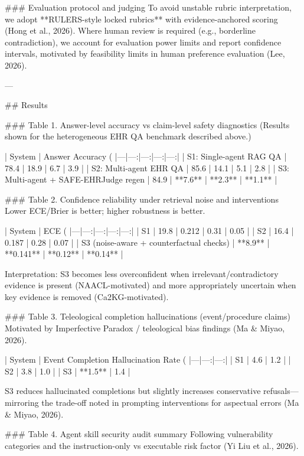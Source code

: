 ### Evaluation protocol and judging  
To avoid unstable rubric interpretation, we adopt **RULERS-style locked rubrics** with evidence-anchored scoring (Hong et al., 2026). Where human review is required (e.g., borderline contradiction), we account for evaluation power limits and report confidence intervals, motivated by feasibility limits in human preference evaluation (Lee, 2026).

---

## Results  

### Table 1. Answer-level accuracy vs claim-level safety diagnostics  
(Results shown for the heterogeneous EHR QA benchmark described above.)

| System | Answer Accuracy (%
|---|---:|---:|---:|---:|
| S1: Single-agent RAG QA | 78.4 | 18.9 | 6.7 | 3.9 |
| S2: Multi-agent EHR QA | 85.6 | 14.1 | 5.1 | 2.8 |
| S3: Multi-agent + SAFE-EHRJudge regen | 84.9 | **7.6** | **2.3** | **1.1** |

### Table 2. Confidence reliability under retrieval noise and interventions  
Lower ECE/Brier is better; higher robustness is better.

| System | ECE (%
|---|---:|---:|---:|---:|
| S1 | 19.8 | 0.212 | 0.31 | 0.05 |
| S2 | 16.4 | 0.187 | 0.28 | 0.07 |
| S3 (noise-aware + counterfactual checks) | **8.9** | **0.141** | **0.12** | **0.14** |

Interpretation: S3 becomes less overconfident when irrelevant/contradictory evidence is present (NAACL-motivated) and more appropriately uncertain when key evidence is removed (Ca2KG-motivated).

### Table 3. Teleological completion hallucinations (event/procedure claims)  
Motivated by Imperfective Paradox / teleological bias findings (Ma & Miyao, 2026).

| System | Event Completion Hallucination Rate (%
|---|---:|---:|
| S1 | 4.6 | 1.2 |
| S2 | 3.8 | 1.0 |
| S3 | **1.5** | 1.4 |

S3 reduces hallucinated completions but slightly increases conservative refusals—mirroring the trade-off noted in prompting interventions for aspectual errors (Ma & Miyao, 2026).

### Table 4. Agent skill security audit summary  
Following vulnerability categories and the instruction-only vs executable risk factor (Yi Liu et al., 2026).

